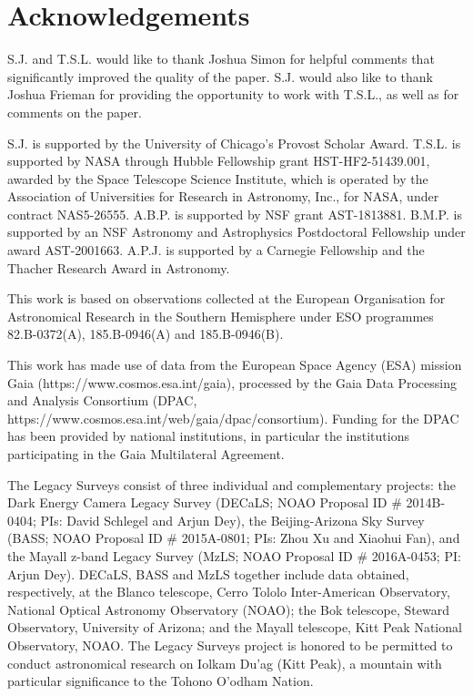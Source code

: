 \documentclass[twocolumn]{aastex63}
\begin{document}
\section{Acknowledgements}
S.J. and T.S.L. would like to thank Joshua Simon for helpful comments that significantly improved the quality of the paper. S.J. would also like to thank Joshua Frieman for providing the opportunity to work with T.S.L., as well as for comments on the paper.

S.J. is supported by the University of Chicago's Provost Scholar Award. 
T.S.L. is supported by NASA through Hubble Fellowship grant HST-HF2-51439.001, awarded by the Space Telescope Science Institute, which is operated by the Association of Universities for Research in Astronomy, Inc., for NASA, under contract NAS5-26555. 
A.B.P. is supported by NSF grant AST-1813881. B.M.P. is supported by an NSF Astronomy and Astrophysics Postdoctoral Fellowship under award AST-2001663.
A.P.J. is supported by a Carnegie Fellowship and the Thacher Research Award in Astronomy.

 
This work is based on observations collected at the European Organisation for Astronomical Research in the Southern Hemisphere under ESO programmes 82.B-0372(A), 185.B-0946(A) and 185.B-0946(B). 

This work has made use of data from the European Space Agency (ESA) mission Gaia (https://www.cosmos.esa.int/gaia), processed by the Gaia Data Processing and Analysis Consortium (DPAC, https://www.cosmos.esa.int/web/gaia/dpac/consortium). Funding for the DPAC has been provided by national institutions, in particular the institutions participating in the Gaia Multilateral Agreement.

The Legacy Surveys consist of three individual and complementary
projects: the Dark Energy Camera Legacy Survey (DECaLS; NOAO Proposal
ID \# 2014B-0404; PIs: David Schlegel and Arjun Dey), the
Beijing-Arizona Sky Survey (BASS; NOAO Proposal ID \# 2015A-0801; PIs:
Zhou Xu and Xiaohui Fan), and the Mayall z-band Legacy Survey (MzLS;
NOAO Proposal ID \# 2016A-0453; PI: Arjun Dey). DECaLS, BASS and MzLS
together include data obtained, respectively, at the Blanco telescope,
Cerro Tololo Inter-American Observatory, National Optical Astronomy
Observatory (NOAO); the Bok telescope, Steward Observatory, University
of Arizona; and the Mayall telescope, Kitt Peak National Observatory,
NOAO. The Legacy Surveys project is honored to be permitted to conduct
astronomical research on Iolkam Du'ag (Kitt Peak), a mountain with
particular significance to the Tohono O'odham Nation.
\end{document}

